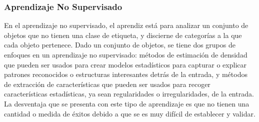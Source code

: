 	\subsubsection{Aprendizaje No Supervisado}

	En el aprendizaje no supervisado, el aprendiz está para analizar un conjunto de objetos que no tienen una clase de etiqueta, y discierne de categorías a la que cada objeto pertenece. Dado un conjunto de objetos, se tiene dos grupos de enfoques en un aprendizaje no supervisado: métodos de estimación de densidad que pueden ser usados para crear modelos estadísticos para capturar o explicar patrones reconocidos o estructuras interesantes detrás de la entrada, y métodos de extracción de características que pueden ser usados para recoger características estadísticas, ya sean regularidades o irregularidades, de la entrada. La desventaja que se presenta con este tipo de aprendizaje es que no tienen una cantidad o medida de éxitos debido a que se es muy difícil de establecer y validar. \\ \\